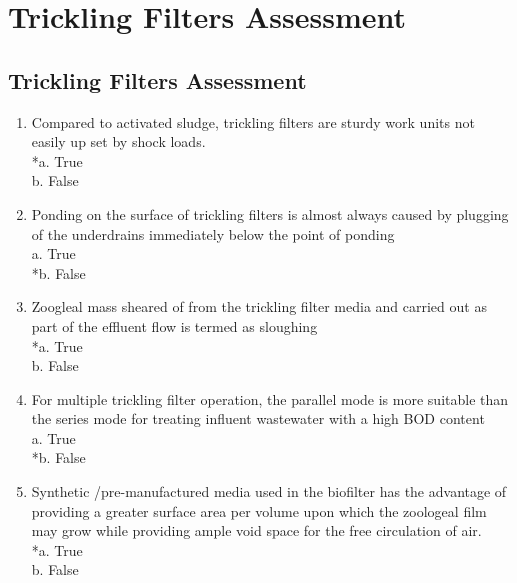 
\chapter{Trickling Filters Assessment}

\section*{Trickling Filters Assessment}
\begin{enumerate}
\item  Compared to activated sludge, trickling filters are sturdy work units not easily up set by shock loads. \\

*a. True \\
b. False \\


\item  Ponding on the surface of trickling filters is almost always caused by plugging of the underdrains immediately below the point of ponding \\

a. True\\
*b. False\\


\item  Zoogleal mass sheared of from the trickling filter media and carried out as part of the effluent flow is termed as sloughing \\

*a. True \\
b. False \\


\item  For multiple trickling filter operation, the parallel mode is more suitable than the series mode for treating influent wastewater with a high BOD content \\

a. True \\
*b. False \\


\item  Synthetic /pre-manufactured media used in the biofilter has the advantage of providing a greater surface area per volume upon which the zoologeal film may grow while providing ample void space for the free circulation of air. \\

*a. True \\
b. False \\



\end{enumerate}
